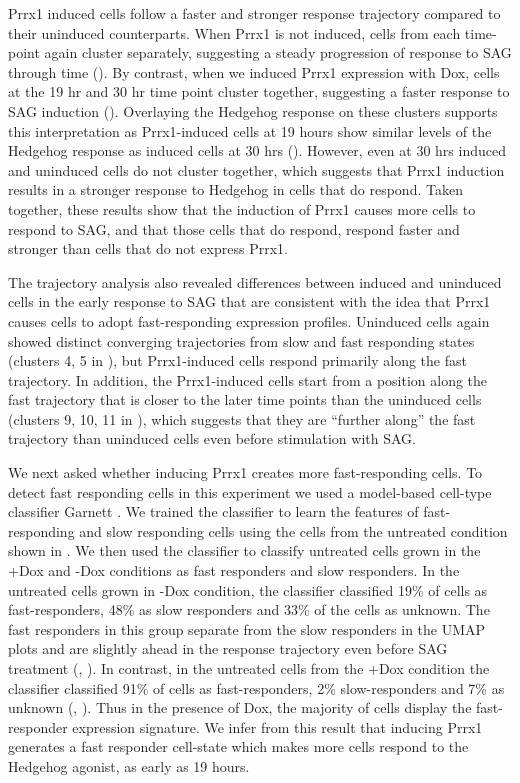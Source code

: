 Prrx1 induced cells follow a faster and stronger response trajectory compared to their uninduced counterparts. When Prrx1 is not induced, cells from each time-point again cluster separately, suggesting a steady progression of response to SAG through time (). By contrast, when we induced Prrx1 expression with Dox, cells at the 19 hr and 30 hr time point cluster together, suggesting a faster response to SAG induction (). Overlaying the Hedgehog response on these clusters supports this interpretation as Prrx1-induced cells at 19 hours show similar levels of the Hedgehog response as induced cells at 30 hrs (). However, even at 30 hrs induced and uninduced cells do not cluster together, which suggests that Prrx1 induction results in a stronger response to Hedgehog in cells that do respond. Taken together, these results show that the induction of Prrx1 causes more cells to respond to SAG, and that those cells that do respond, respond faster and stronger than cells that do not express Prrx1.

The trajectory analysis also revealed differences between induced and uninduced cells in the early response to SAG that are consistent with the idea that Prrx1 causes cells to adopt fast-responding expression profiles. Uninduced cells again showed distinct converging trajectories from slow and fast responding states (clusters 4, 5 in ), but Prrx1-induced cells respond primarily along the fast trajectory. In addition, the Prrx1-induced cells start from a position along the fast trajectory that is closer to the later time points than the uninduced cells (clusters 9, 10, 11 in ), which suggests that they are “further along” the fast trajectory than uninduced cells even before stimulation with SAG. 

We next asked whether inducing Prrx1 creates more fast-responding cells. To detect fast responding cells in this experiment we used a model-based cell-type classifier Garnett \cite{Pliner2019-vn}. We trained the classifier to learn the features of fast-responding and slow responding cells using the cells from the untreated condition shown in . We then used the classifier to classify untreated cells grown in the +Dox and -Dox conditions as fast responders and slow responders. In the untreated cells grown in -Dox condition, the classifier classified 19\% of cells as fast-responders, 48\% as slow responders and 33\% of the cells as unknown. The fast responders in this group separate from the slow responders in the UMAP plots and are slightly ahead in the response trajectory even before SAG treatment  (, ). In contrast, in the untreated cells from the +Dox condition the classifier classified 91\% of cells as fast-responders, 2\% slow-responders and 7\% as unknown (, ). Thus in the presence of Dox, the majority of cells display the fast-responder expression signature. We infer from this result that inducing Prrx1 generates a fast responder cell-state which makes more cells respond to the Hedgehog agonist, as early as 19 hours.

